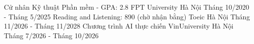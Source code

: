 \begin{cventries}
  \cventry
    {Cử nhân Kỹ thuật Phần mềm - GPA: 2.8}
    {FPT University}
    {Hà Nội}
    {Tháng 10/2020 - Tháng 5/2025}
    {}
  \cventry
    {Reading and Listening: 890 (chờ nhận bằng)}
    {Toeic }
    {Hà Nội}
    {Tháng 11/2026 - Tháng 11/2028}
    {}
  \cventry
    {Chương trình AI thực chiến}
    {VinUniversity}
    {Hà Nội}
    {Tháng 7/2026 - Tháng 10/2026}
    {}
\end{cventries}
